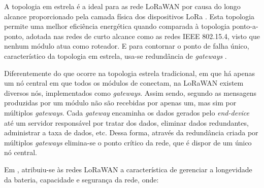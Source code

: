 A topologia em estrela é a ideal para as rede LoRaWAN por causa do longo alcance proporcionado pela camada física dos dispositivos LoRa \cite{GIULIO}. Esta topologia permite uma melhor eficiência energética quando comparada à topologia ponto-a-ponto, adotada nas redes de curto alcance como as redes IEEE 802.15.4, visto que nenhum módulo atua como roteador. E para contornar o ponto de falha único, característico da topologia em estrela, usa-se redundância de \textit{gateways} \cite{loraAllianceWhatIs}. 

Diferentemente do que ocorre na topologia estrela tradicional, em que há apenas um nó central em que todos os módulos de conectam, na LoRaWAN existem diversos nós, implementados como \textit{gateways}. Assim sendo, segundo  as mensagens produzidas por um módulo não são recebidas por apenas um, mas sim por múltiplos \textit{gateways}. Cada \textit{gateway} encaminha os dados gerados pelo \textit{end-device} até um servidor responsável por tratar dos dados, eliminar dados redundantes, administrar a taxa de dados, etc. Dessa forma, através da redundância criada por múltiplos \textit{gateways} elimina-se o ponto crítico da rede, que é dispor de um único nó central.

Em , atribuiu-se às redes LoRaWAN a característica de gerenciar a longevidade da bateria, capacidade e segurança da rede, onde:

